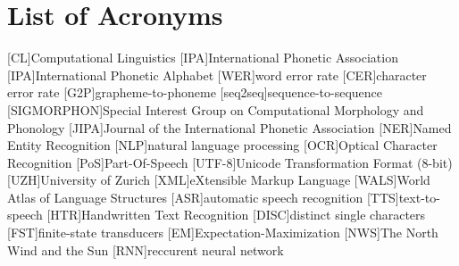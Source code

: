{}
\chapter*{List of Acronyms}
\begin{acronym}[WER]\itemsep3pt
[CL]{Computational Linguistics}
[IPA]{International Phonetic Association}
[IPA]{International Phonetic Alphabet}
[WER]{word error rate}
[CER]{character error rate}
[G2P]{grapheme-to-phoneme} 
[seq2seq]{sequence-to-sequence} 
[SIGMORPHON]{Special Interest Group on Computational  Morphology and Phonology}
[JIPA]{Journal of the International Phonetic Association}
[NER]{Named Entity Recognition}
[NLP]{natural language processing}
[OCR]{Optical Character Recognition}
[PoS]{Part-Of-Speech}
[UTF-8]{Unicode Transformation Format (8-bit)}
[UZH]{University of Zurich}
[XML]{eXtensible Markup Language}
[WALS]{World Atlas of Language Structures}
[ASR]{automatic speech recognition}
[TTS]{text-to-speech}
[HTR]{Handwritten Text Recognition}
[DISC]{distinct single characters}
[FST]{finite-state transducers}
[EM]{Expectation-Maximization}
[NWS]{The North Wind and the Sun}
[RNN]{reccurent neural network}
\end{acronym}